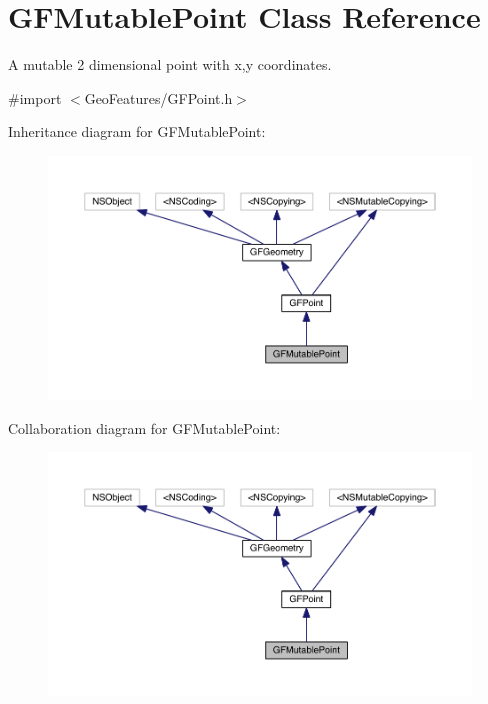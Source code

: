 \hypertarget{interface_g_f_mutable_point}{}\section{G\+F\+Mutable\+Point Class Reference}
\label{interface_g_f_mutable_point}


A mutable 2 dimensional point with x,y coordinates.  




{\ttfamily \#import $<$Geo\+Features/\+G\+F\+Point.\+h$>$}



Inheritance diagram for G\+F\+Mutable\+Point\+:
\nopagebreak
\begin{figure}[H]
\begin{center}
\leavevmode
\includegraphics[width=350pt]{interface_g_f_mutable_point__inherit__graph}
\end{center}
\end{figure}


Collaboration diagram for G\+F\+Mutable\+Point\+:
\nopagebreak
\begin{figure}[H]
\begin{center}
\leavevmode
\includegraphics[width=350pt]{interface_g_f_mutable_point__coll__graph}
\end{center}
\end{figure}
